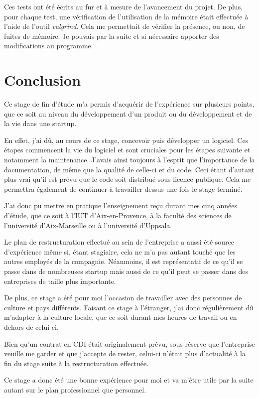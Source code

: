 \documentclass[a4paper,10pt, twoside]{report}
\begin{document}
\begin{spacing}{1.2}
Ces tests ont été écrits au fur et à mesure de l'avancement du projet.
De plus, pour chaque test, une vérification de l'utilisation de la mémoire
était effectuée à l'aide de l'outil \textit{valgrind}. Cela me permettait
de vérifier la présence, ou non, de fuites de mémoire. Je pouvais par la
suite et si nécessaire apporter des modifications au programme.

\chapter{Conclusion}
Ce stage de fin d'étude m'a permis d'acquérir de l'expérience sur
plusieurs points, que ce soit au niveau du développement d'un produit ou du
développement et de la vie dans une startup.

En effet, j'ai dû, au cours de ce stage, concevoir puis développer un
logiciel. Ces étapes commencent la vie du logiciel et sont cruciales pour les
étapes suivante et notamment la maintenance. J'avais ainsi toujours à
l'esprit que l'importance de la documentation, de même que la qualité de
celle-ci et du code. Ceci étant d'autant plus vrai qu'il est prévu que le
code soit distribué sous licence publique. Cela me permettra également de
continuer à travailler dessus une fois le stage terminé.

J'ai donc pu mettre en pratique l'enseignement reçu durant mes cinq années
d'étude, que ce soit à l'IUT d'Aix-en-Provence, à la faculté des sciences de
l'université d'Aix-Marseille ou à l'université d'Uppsala.

Le plan de restructuration effectué au sein de l'entreprise a aussi été
source d'expérience même si, étant stagiaire, cela ne m'a pas autant
touché que les autres employés de la compagnie. Néanmoins, il est
représentatif de ce qu'il se passe dans de nombreuses startup mais aussi de
ce qu'il peut se passer dans des entreprises de taille plus importante.

De plus, ce stage a été pour moi l'occasion de travailler avec des personnes
de culture et pays différents. Faisant ce stage à l'étranger, j'ai donc
régulièrement dû m'adapter à la culture locale, que ce soit durant mes
heures de travail ou en dehors de celui-ci.

Bien qu'un contrat en CDI était originalement prévu, sous réserve que
l'entreprise veuille me garder et que j'accepte de rester, celui-ci n'était
plus d'actualité à la fin du stage suite à la restructuration effectuée.

Ce stage a donc été une bonne expérience pour moi et va m'être utile par
la suite autant sur le plan professionnel que personnel.


\end{spacing}
\end{document}
